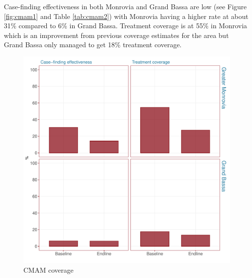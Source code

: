 \documentclass[12pt,a4paper]{article}
\begin{document}
Case-finding effectiveness in both Monrovia and Grand Bassa are low (see Figure \ref{fig:cmam1} and Table \ref{tab:cmam2}) with Monrovia having a higher rate at about 31\% compared to 6\% in Grand Bassa. Treatment coverage is at 55\% in Monrovia which is an improvement from previous coverage estimates for the area but Grand Bassa only managed to get 18\% treatment coverage.

\begin{figure}[H]

{\centering \includegraphics{liberiaCoverageFinalReport_files/figure-latex/cmam1plot-1} 

}

\caption{CMAM coverage}\label{fig:cmam1plot}
\end{figure}
\end{document}
